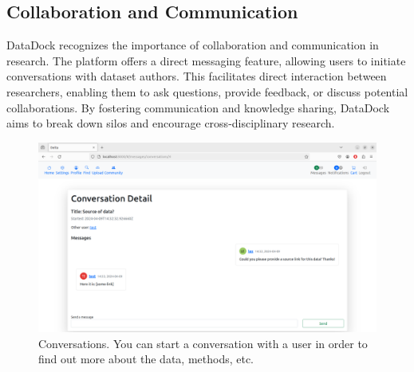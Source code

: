 \documentclass[conference]{IEEEtran}
\begin{document}
\subsection{Collaboration and Communication}
DataDock recognizes the importance of collaboration and communication in research. The platform offers a direct messaging feature, allowing users to initiate conversations with dataset authors. This facilitates direct interaction between researchers, enabling them to ask questions, provide feedback, or discuss potential collaborations. By fostering communication and knowledge sharing, DataDock aims to break down silos and encourage cross-disciplinary research.
\begin{figure}[h]
  \centering
  \includegraphics[width=\columnwidth]{figures/convo.png}
  \caption{Conversations. You can start a conversation with a user in order to find out more about the data, methods, etc.}
  \label{fig:delta-convo}
\end{figure}
\end{document}
